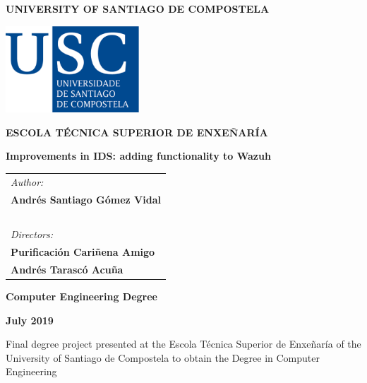\pagestyle{empty}
\begin{center}
{\bf\Large UNIVERSITY OF SANTIAGO DE COMPOSTELA}

\vspace{0.5cm}
\includegraphics[width=5cm]{figuras/logo_usc.eps}

\vspace{0.5cm}
{\bf\large ESCOLA TÉCNICA SUPERIOR DE ENXEÑARÍA}

\vspace{2cm}
{\bf\LARGE Improvements in IDS: adding functionality to Wazuh}

\end{center}

\vspace{2cm}
\hspace{4cm}\begin{tabular}{l}
{\it\Large Author:} \\
{\bf\Large Andrés Santiago Gómez Vidal} \\
~ \\
{\it\Large Directors:} \\
{\bf\Large Purificación Cariñena Amigo} \\
{\bf\Large Andrés Tarascó Acuña} \\
\end{tabular}

\vspace{2cm}
\begin{center}
{\bf\Large Computer Engineering Degree}

\vspace{0.5cm}
{\bf\large July 2019}

\vspace{0.5cm}
Final degree project presented at the Escola Técnica Superior de Enxeñaría of the University of Santiago de Compostela to obtain the Degree in Computer Engineering
\end{center}

